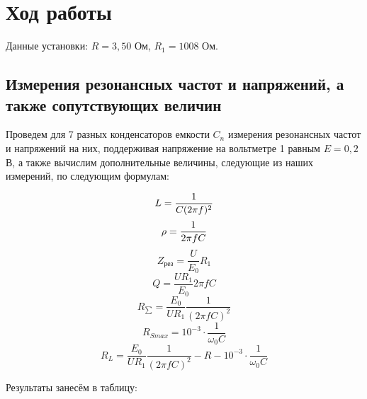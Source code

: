 \documentclass[a4paper, 12pt]{article}
\begin{document}
    \section{Ход работы}

        Данные установки: $ R = 3,50  $ Ом, $ R_1 = 1008 $ Ом.

        \subsection{Измерения резонансных частот и напряжений, а также сопутствующих величин}

            Проведем для 7 разных конденсаторов емкости $ C_n $ измерения резонансных частот и напряжений на них, поддерживая напряжение на вольтметре 1 равным $ E = 0,2 $ В, а также вычислим дополнительные величины, следующие из наших измерений, по следующим формулам:

            \begin{equation}\label{}
            L=\frac{1}{C(2\pi f)^2} \\
            \end{equation}
            \begin{equation}\label{}
            \rho=\frac{1}{2\pi fC} \\
            \end{equation}
            \begin{equation}\label{}
            Z_{\text{рез}}=\frac{U}{E_0}R_1
            \end{equation}
            \begin{equation}\label{}
            Q=\frac{UR_1}{E_0}2\pi fC
            \end{equation}
            \begin{equation}\label{}
            R_{\sum}=\frac{E_0}{UR_1}\frac{1}{(2\pi fC)^2}
            \end{equation}
            \begin{equation}\label{}
            R_{Smax}=10^{-3}\cdot\frac{1}{\omega_0C}
            \end{equation}
            \begin{equation}\label{}
            R_L=\frac{E_0}{UR_1}\frac{1}{(2\pi fC)^2}-R-10^{-3}\cdot\frac{1}{\omega_0C}
            \end{equation}

            Результаты занесём в таблицу:
\end{document}
